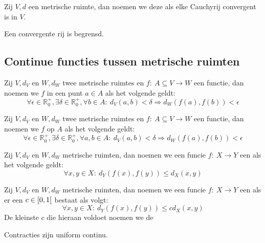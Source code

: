 \documentclass[main.tex]{subfiles}
\begin{document}
\begin{de}
  Zij $V,d$ een metrische ruimte, dan noemen we deze  als elke Cauchyrij convergent is in $V$.
\end{de}

\begin{st}
  Een convergente rij is begrensd.
\end{st}

\subsection{Continue functies tussen metrische ruimten}
\label{sec:cont-funct-tuss}

\begin{de}
  Zij $V,d_{V}$ en $W,d_{W}$ twee metrische ruimtes en $f:\ A \subseteq V \rightarrow W$ een functie, dan noemen we $f$  in een punt $a\in A$ als het volgende geldt:
  \[ \forall \epsilon \in \mathbb{R}_{0}^{+}, \exists \delta \in \mathbb{R}_{0}^{+}, \forall b \in A:\ d_{V}(a,b)< \delta \Rightarrow d_{W}(f(a),f(b)) < \epsilon \]
\end{de}

\begin{de}
  Zij $V,d_{V}$ en $W,d_{W}$ twee metrische ruimtes en $f:\ A \subseteq V \rightarrow W$ een functie, dan noemen we $f$  op $A$ als het volgende geldt:
  \[ \forall \epsilon \in \mathbb{R}_{0}^{+}, \exists \delta \in \mathbb{R}_{0}^{+}, \forall a,b \in A:\ d_{V}(a,b)< \delta \Rightarrow d_{W}(f(a),f(b)) < \epsilon \]
\end{de}

\begin{de}
  Zij $V,d_{V}$ en $W,d_{W}$ metrische ruimten, dan noemen we een funcie $f:\ X \rightarrow Y$ een  als het volgende geldt:
  \[ \forall x,y\in X:\ d_{Y}(f(x),f(y)) \le d_{X}(x,y) \]
\end{de}

\begin{de}
  Zij $V,d_{V}$ en $W,d_{W}$ metrische ruimten, dan noemen we een funcie $f:\ X \rightarrow Y$ een  als er een $c\in \interval[open right]{0}{1}$ bestaat als volgt:
  \[ \forall x,y\in X:\ d_{Y}(f(x),f(y)) \le c d_{X}(x,y) \]
  De kleinste $c$ die hieraan voldoet noemen we de 
\end{de}

\begin{st}
  Contracties zijn uniform continu.
\end{st}
\end{document}
